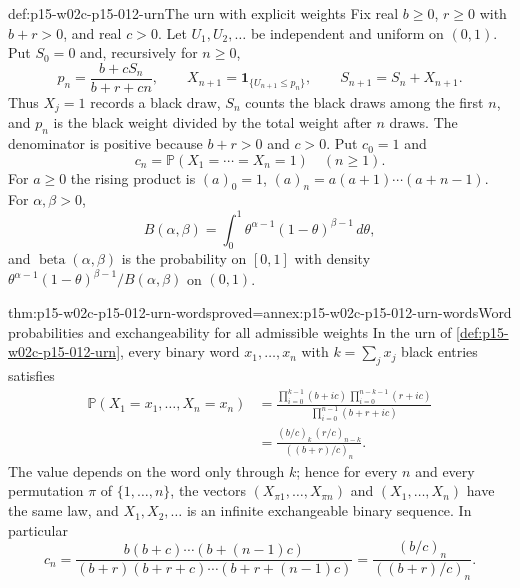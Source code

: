 \begin{hbdefinition}{def:p15-w02c-p15-012-urn}{The urn with explicit weights}
Fix real \(b\geq0\), \(r\geq0\) with \(b+r>0\), and real \(c>0\).
Let \(U_1,U_2,\ldots\) be independent and uniform on \((0,1)\).
Put \(S_0=0\) and, recursively for \(n\geq0\),
\[
 p_n=\frac{b+cS_n}{b+r+cn},\qquad
 X_{n+1}=\mathbf 1_{\{U_{n+1}\leq p_n\}},\qquad
 S_{n+1}=S_n+X_{n+1}.
\]
Thus \(X_j=1\) records a black draw, \(S_n\) counts the black draws among
the first \(n\), and \(p_n\) is the black weight divided by the total
weight after \(n\) draws. The denominator is positive because \(b+r>0\)
and \(c>0\). Put \(c_0=1\) and
\[
 c_n=\mathbb P(X_1=\cdots=X_n=1)\quad(n\geq1).
\]
For \(a\geq0\) the rising product is \((a)_0=1\),
\((a)_n=a(a+1)\cdots(a+n-1)\). For \(\alpha,\beta>0\),
\[
 B(\alpha,\beta)=\int_0^1\theta^{\alpha-1}(1-\theta)^{\beta-1}\,d\theta,
\]
and \(\operatorname{beta}(\alpha,\beta)\) is the probability on \([0,1]\)
with density \(\theta^{\alpha-1}(1-\theta)^{\beta-1}/B(\alpha,\beta)\) on
\((0,1)\).
\end{hbdefinition}

\begin{hblemma}{thm:p15-w02c-p15-012-urn-words}{proved=annex:p15-w02c-p15-012-urn-words}{Word probabilities and exchangeability for all admissible weights}
In the urn of \cref{def:p15-w02c-p15-012-urn}, every binary word
\(x_1,\ldots,x_n\) with \(k=\sum_jx_j\) black entries satisfies
\begin{align*}
 \mathbb P(X_1=x_1,\ldots,X_n=x_n)
   &=\frac{\prod_{i=0}^{k-1}(b+ic)\,\prod_{i=0}^{n-k-1}(r+ic)}
         {\prod_{i=0}^{n-1}(b+r+ic)}\\
   &=\frac{(b/c)_k\,(r/c)_{n-k}}{((b+r)/c)_n}.
\end{align*}
The value depends on the word only through \(k\); hence for every \(n\)
and every permutation \(\pi\) of \(\{1,\ldots,n\}\), the vectors
\((X_{\pi1},\ldots,X_{\pi n})\) and \((X_1,\ldots,X_n)\) have the same law,
and \(X_1,X_2,\ldots\) is an infinite exchangeable binary sequence.
In particular
\[
 c_n=\frac{b(b+c)\cdots(b+(n-1)c)}{(b+r)(b+r+c)\cdots(b+r+(n-1)c)}
    =\frac{(b/c)_n}{((b+r)/c)_n}.
\]
\end{hblemma}

